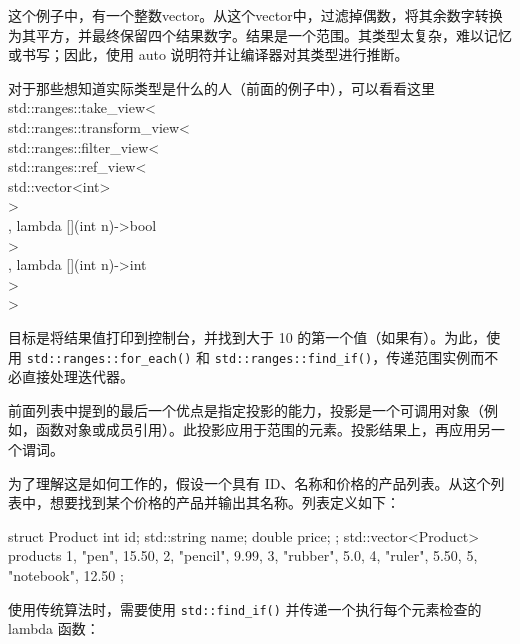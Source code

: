 这个例子中，有一个整数vector。从这个vector中，过滤掉偶数，将其余数字转换为其平方，并最终保留四个结果数字。结果是一个范围。其类型太复杂，难以记忆或书写；因此，使用 auto 说明符并让编译器对其类型进行推断。

\begin{myNotic}
对于那些想知道实际类型是什么的人（前面的例子中），可以看看这里\\std::ranges::take\_view<\\
\hspace*{0.5cm}std::ranges::transform\_view<\\
\hspace*{1.0cm}std::ranges::filter\_view<\\
\hspace*{1.5cm}std::ranges::ref\_view<\\
\hspace*{2.0cm}std::vector<int>\\
\hspace*{1.5cm}>\\
\hspace*{1.0cm}, lambda [](int n)->bool\\
\hspace*{1.0cm}>\\
\hspace*{0.5cm}, lambda [](int n)->int\\
\hspace*{0.5cm}>\\
>
\end{myNotic}

目标是将结果值打印到控制台，并找到大于 10 的第一个值（如果有）。为此，使用 \verb|std::ranges::for_each()| 和 \verb|std::ranges::find_if()|，传递范围实例而不必直接处理迭代器。

前面列表中提到的最后一个优点是指定投影的能力，投影是一个可调用对象（例如，函数对象或成员引用）。此投影应用于范围的元素。投影结果上，再应用另一个谓词。

为了理解这是如何工作的，假设一个具有 ID、名称和价格的产品列表。从这个列表中，想要找到某个价格的产品并输出其名称。列表定义如下：

\begin{cpp}
struct Product
{
    int         id;
    std::string name;
    double      price;
};
std::vector<Product> products
{
    {1, "pen", 15.50},
    {2, "pencil", 9.99},
    {3, "rubber", 5.0},
    {4, "ruler", 5.50},
    {5, "notebook", 12.50}
};
\end{cpp}

使用传统算法时，需要使用 \verb|std::find_if()| 并传递一个执行每个元素检查的 lambda 函数：

